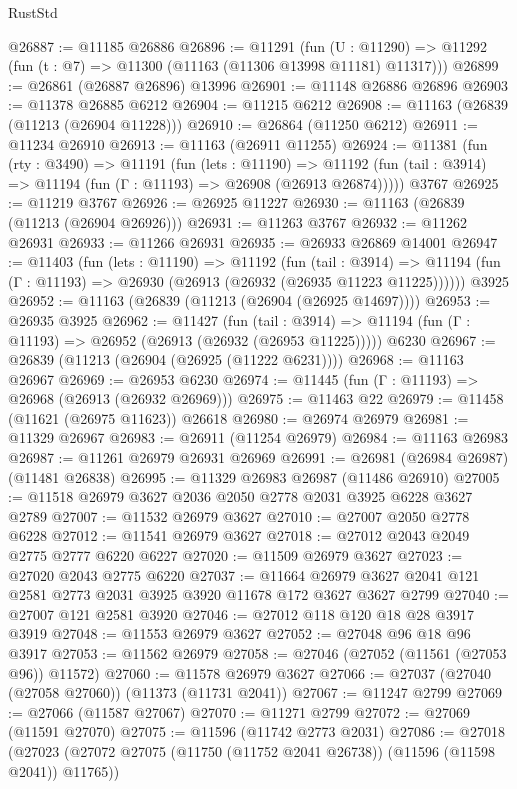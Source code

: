 \begin{lexlean}{RustStd}
\begin{coremodule}
@26887 := @11185 @26886
@26896 := @11291
    (fun (U : @11290) => @11292 (fun (t : @7) => @11300 (@11163 (@11306 @13998 @11181) @11317)))
@26899 := @26861 (@26887 @26896) @13996
@26901 := @11148 @26886 @26896
@26903 := @11378 @26885 @6212
@26904 := @11215 @6212
@26908 := @11163 (@26839 (@11213 (@26904 @11228)))
@26910 := @26864 (@11250 @6212)
@26911 := @11234 @26910
@26913 := @11163 (@26911 @11255)
@26924 := @11381
    (fun (rty : @3490) =>
    @11191
      (fun (lets : @11190) =>
      @11192 (fun (tail : @3914) => @11194 (fun (Γ : @11193) => @26908 (@26913 @26874)))))
    @3767
@26925 := @11219 @3767
@26926 := @26925 @11227
@26930 := @11163 (@26839 (@11213 (@26904 @26926)))
@26931 := @11263 @3767
@26932 := @11262 @26931
@26933 := @11266 @26931
@26935 := @26933 @26869 @14001
@26947 := @11403
    (fun (lets : @11190) =>
    @11192
      (fun (tail : @3914) =>
      @11194 (fun (Γ : @11193) => @26930 (@26913 (@26932 (@26935 @11223 @11225))))))
    @3925
@26952 := @11163 (@26839 (@11213 (@26904 (@26925 @14697))))
@26953 := @26935 @3925
@26962 := @11427
    (fun (tail : @3914) => @11194 (fun (Γ : @11193) => @26952 (@26913 (@26932 (@26953 @11225)))))
    @6230
@26967 := @26839 (@11213 (@26904 (@26925 (@11222 @6231))))
@26968 := @11163 @26967
@26969 := @26953 @6230
@26974 := @11445 (fun (Γ : @11193) => @26968 (@26913 (@26932 @26969)))
@26975 := @11463 @22
@26979 := @11458 (@11621 (@26975 @11623)) @26618
@26980 := @26974 @26979
@26981 := @11329 @26967
@26983 := @26911 (@11254 @26979)
@26984 := @11163 @26983
@26987 := @11261 @26979 @26931 @26969
@26991 := @26981 (@26984 @26987) (@11481 @26838)
@26995 := @11329 @26983 @26987 (@11486 @26910)
@27005 := @11518 @26979 @3627 @2036 @2050 @2778 @2031 @3925 @6228 @3627 @2789
@27007 := @11532 @26979 @3627
@27010 := @27007 @2050 @2778 @6228
@27012 := @11541 @26979 @3627
@27018 := @27012 @2043 @2049 @2775 @2777 @6220 @6227
@27020 := @11509 @26979 @3627
@27023 := @27020 @2043 @2775 @6220
@27037 := @11664 @26979 @3627 @2041 @121 @2581 @2773 @2031 @3925 @3920 @11678 @172 @3627 @3627 @2799
@27040 := @27007 @121 @2581 @3920
@27046 := @27012 @118 @120 @18 @28 @3917 @3919
@27048 := @11553 @26979 @3627
@27052 := @27048 @96 @18 @96 @3917
@27053 := @11562 @26979
@27058 := @27046 (@27052 (@11561 (@27053 @96)) @11572)
@27060 := @11578 @26979 @3627
@27066 := @27037 (@27040 (@27058 @27060)) (@11373 (@11731 @2041))
@27067 := @11247 @2799
@27069 := @27066 (@11587 @27067)
@27070 := @11271 @2799
@27072 := @27069 (@11591 @27070)
@27075 := @11596 (@11742 @2773 @2031)
@27086 := @27018
    (@27023 (@27072 @27075 (@11750 (@11752 @2041 @26738)) (@11596 (@11598 @2041)) @11765))

\end{coremodule}
\end{lexlean}
